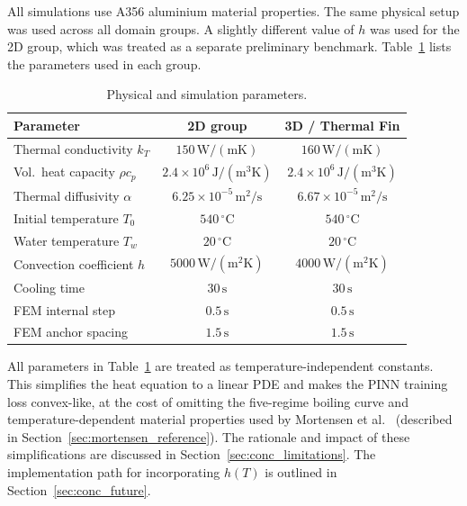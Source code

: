 All simulations use A356 aluminium material properties.
The same physical setup was used across all domain groups.
A slightly different value of $h$ was used for the 2D group, which was treated
as a separate preliminary benchmark.
Table~\ref{tab:params} lists the parameters used in each group.

\begin{table}[H]
\centering
\caption{Physical and simulation parameters.}
\label{tab:params}
\small
\begin{tabular}{lcc}
\toprule
Parameter & 2D group & 3D / Thermal Fin \\
\midrule
Thermal conductivity $k_T$     & $150\,\mathrm{W/(mK)}$                & $160\,\mathrm{W/(mK)}$ \\
Vol.\ heat capacity $\rho c_p$ & $2.4{\times}10^6\,\mathrm{J/(m^3K)}$  & $2.4{\times}10^6\,\mathrm{J/(m^3K)}$ \\
Thermal diffusivity $\alpha$   & $6.25{\times}10^{-5}\,\mathrm{m^2/s}$ & $6.67{\times}10^{-5}\,\mathrm{m^2/s}$ \\
Initial temperature $T_0$      & $540\,^\circ\mathrm{C}$                & $540\,^\circ\mathrm{C}$ \\
Water temperature $T_w$        & $20\,^\circ\mathrm{C}$                 & $20\,^\circ\mathrm{C}$ \\
Convection coefficient $h$     & $5000\,\mathrm{W/(m^2K)}$              & $4000\,\mathrm{W/(m^2K)}$ \\
Cooling time                   & $30\,\mathrm{s}$                       & $30\,\mathrm{s}$ \\
FEM internal step              & $0.5\,\mathrm{s}$                      & $0.5\,\mathrm{s}$ \\
FEM anchor spacing             & $1.5\,\mathrm{s}$                      & $1.5\,\mathrm{s}$ \\
\bottomrule
\end{tabular}
\end{table}

All parameters in Table~\ref{tab:params} are treated as temperature-independent
constants.
This simplifies the heat equation to a linear PDE and makes the PINN training
loss convex-like, at the cost of omitting the five-regime boiling curve and
temperature-dependent material properties used by Mortensen
et al.~\cite{mortensen2026} (described in
Section~\ref{sec:mortensen_reference}).
The rationale and impact of these simplifications are discussed in
Section~\ref{sec:conc_limitations}.
The implementation path for incorporating $h(T)$ is outlined in
Section~\ref{sec:conc_future}.


